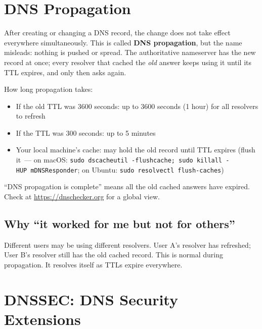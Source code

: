 \setcounter{section}{6}
\section{DNS Propagation}\label{27-domain-and-dns:277-dns-propagation}

After creating or changing a DNS record, the change does not take effect everywhere simultaneously. This is called \textbf{DNS propagation}, but the name misleads: nothing is pushed or spread. The authoritative nameserver has the new record at once; every resolver that cached the \emph{old} answer keeps using it until its TTL expires, and only then asks again.

How long propagation takes:

\begin{itemize}
\tightlist
\item
  If the old TTL was 3600 seconds: up to 3600 seconds (1 hour) for all resolvers to refresh
\item
  If the TTL was 300 seconds: up to 5 minutes
\item
  Your local machine's cache: may hold the old record until TTL expires (flush it~--- on macOS: \texttt{sudo\ dscacheutil\ -}\allowbreak{}\texttt{flushcache;\ sudo\ killall\ -}\allowbreak{}\texttt{HUP\ mDNSResponder}; on Ubuntu: \texttt{sudo\ resolvectl\ flush-}\allowbreak{}\texttt{caches})
\end{itemize}

\noindent{}``DNS propagation is complete'' means all the old cached answers have expired. Check at \url{https://dnschecker.org} for a global view.

\subsection*{Why ``it worked for me but not for others''}\label{27-domain-and-dns:why-it-worked-for-me-but-not-for-others}

Different users may be using different resolvers. User A's resolver has refreshed; User B's resolver still has the old cached record. This is normal during propagation. It resolves itself as TTLs expire everywhere.

\setcounter{section}{7}
\section{DNSSEC: DNS Security Extensions}\label{27-domain-and-dns:278-dnssec-dns-security-extensions}

